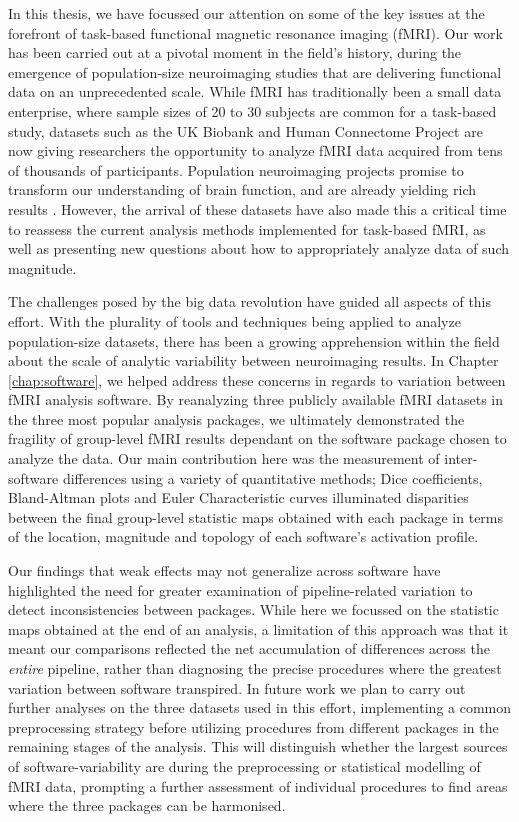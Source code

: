 In this thesis, we have focussed our attention on some of the key issues at the forefront of task-based functional magnetic resonance imaging (fMRI). Our work has been carried out at a pivotal moment in the field's history, during the emergence of population-size neuroimaging studies that are delivering functional data on an unprecedented scale. While fMRI has traditionally been a small data enterprise, where sample sizes of 20 to 30 subjects are common for a task-based study, datasets such as the UK Biobank and Human Connectome Project are now giving researchers the opportunity to analyze fMRI data acquired from tens of thousands of participants. Population neuroimaging projects promise to transform our understanding of brain function, and are already yielding rich results \citep{Miller2016-hd, David_C_Van_Essen2016-bt}. However, the arrival of these datasets have also made this a critical time to reassess the current analysis methods implemented for task-based fMRI, as well as presenting new questions about how to appropriately analyze data of such magnitude.

The challenges posed by the big data revolution have guided all aspects of this effort. With the plurality of tools and techniques being applied to analyze population-size datasets, there has been a growing apprehension within the field about the scale of analytic variability between neuroimaging results. In Chapter \ref{chap:software}, we helped address these concerns in regards to variation between fMRI analysis software. By reanalyzing three publicly available fMRI datasets in the three most popular analysis packages, we ultimately demonstrated the fragility of group-level fMRI results dependant on the software package chosen to analyze the data. Our main contribution here was the measurement of inter-software differences using a variety of quantitative methods; Dice coefficients, Bland-Altman plots and Euler Characteristic curves illuminated disparities between the final group-level statistic maps obtained with each package in terms of the location, magnitude and topology of each software's activation profile. 

Our findings that weak effects may not generalize across software have highlighted the need for greater examination of pipeline-related variation to detect inconsistencies between packages. While here we focussed on the statistic maps obtained at the end of an analysis, a limitation of this approach was that it meant our comparisons reflected the net accumulation of differences across the \textit{entire} pipeline, rather than diagnosing the precise procedures where the greatest variation between software transpired. In future work we plan to carry out further analyses on the three datasets used in this effort, implementing a common preprocessing strategy before utilizing procedures from different packages in the remaining stages of the analysis. This will distinguish whether the largest sources of software-variability are during the preprocessing or statistical modelling of fMRI data, prompting a further assessment of individual procedures to find areas where the three packages can be harmonised. 

